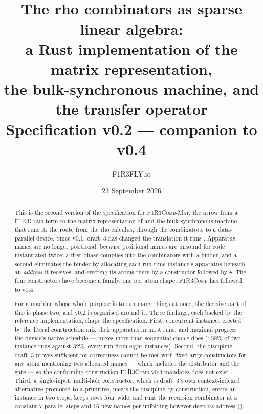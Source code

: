 \documentclass[11pt,a4paper]{article}
\title{\textbf{\Mat}\\[1mm]
\large The rho combinators as sparse linear algebra:\\
a Rust implementation of the matrix representation,\\
the bulk-synchronous machine, and the transfer operator\\[2mm]
\normalsize Specification v0.2 --- companion to \Comb{} v0.4}
\author{F1R3FLY.io}
\date{23 September 2026}
\newcommand{\Comb}{\textsc{F1R3Comb}}
\newcommand{\Mat}{\textsc{F1R3Comb-Mat}}
\newcommand{\ev}{\mathsf{e}}
\theoremstyle{definition}
\theoremstyle{plain}
\begin{document}
\maketitle

\begin{abstract}
\noindent
This is the second version of the specification for \Mat, the arrow from a
\Comb{} term to the matrix representation of \cite{matnote} and the
bulk-synchronous machine that runs it: the route from the rho calculus,
through the combinators, to a data-parallel device. Since v0.1, draft~3 has
changed the translation it runs \cite[\S6]{draft3}. Apparatus names are no
longer positional, because positional names are unsound for code instantiated
twice; a first phase compiles into the combinators with a binder, and a second
eliminates the binder by allocating each run-time instance's apparatus beneath
an \emph{address} it receives, and erecting its atoms there by a constructor
followed by $\ev$. The four constructors have become a family, one per atom
shape. \Comb{} has followed, to v0.4 \cite{combspec}.

For a machine whose whole purpose is to run many things at once, the
decisive part of this is phase two, and v0.2 is organised around it. Three
findings, each backed by the reference implementation, shape the
specification. First, concurrent instances erected by the literal
construction \cite[Def.~6.8]{draft3} mix their apparatus in most runs, and
maximal progress --- the device's native schedule --- mixes more than
sequential choice does (\cite[Find.~14.1]{matnote}: 58\% of two-instance runs
against 32\%, every run from eight instances). Second, the discipline draft~3
proves sufficient for correctness \cite[Def.~6.10, Lem.~6.11]{draft3} cannot
be met with fixed-arity constructors for any atom mentioning two allocated
names --- which includes the distributor and the gate --- so the conforming
construction \Comb{} v0.4 mandates \cite[Req.~5.16]{combspec} does not exist
\cite[Prop.~14.3]{matnote}. Third, a single-input, multi-hole constructor,
which is draft~3's own context-indexed alternative \cite[Rem.~3.14]{draft3}
promoted to a primitive, meets the discipline by construction, erects an
instance in two steps, keeps rows four wide, and runs the recursion
combinator at a constant 7 parallel steps and 16 new names per unfolding
however deep its address (\cite[Find.~14.4]{matnote}).


\end{abstract}
\end{document}
